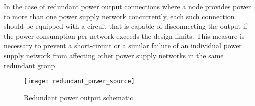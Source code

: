 In the case of redundant power output connections where a node provides power to more than one power supply network
concurrently, each such connection should be equipped with a circuit that is capable of disconnecting the output
if the power consumption per network exceeds the design limits.
This measure is necessary to prevent a short-circuit or a similar failure of an individual power supply network
from affecting other power supply networks in the same redundant group.

\begin{figure}[H]
    \centering
    \texttt{[image: redundant\_power\_source]}
    \caption{Redundant power output schematic}
\end{figure}
